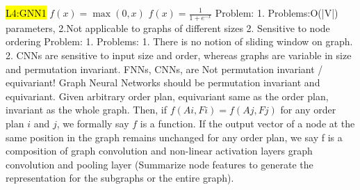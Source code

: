 \hl{L4:GNN1} \(f(x) = \max(0, x)\) \(f(x) = \frac{1}{{1 + e^{-x}}}\)
Problem: 1. Problems:O(|V|) parameters, 2.Not applicable to graphs of different sizes 2. Sensitive to node ordering
Problem: 1. Problems: 1. There is no notion of sliding window on graph. 2. CNNs are sensitive to input size and order, whereas graphs are variable in size and permutation invariant. 
 FNNs, CNNs, are Not permutation invariant / equivariant! Graph Neural Networks should be permutation invariant and equivariant. Given arbitrary order plan, equivariant same as the order plan, invariant as the whole graph. Then, if \( f(Ai,Fi) = f(Aj,Fj) \) for any order plan \( i \) and \( j \), we formally say \( f \) is a  function. If the output vector of a node at the same position in the graph remains unchanged for any order plan, we say f is 
 a composition of graph convolution and non-linear activation layers
 graph convolution and pooling layer (Summarize node features to generate the representation for the subgraphs or the entire graph).


